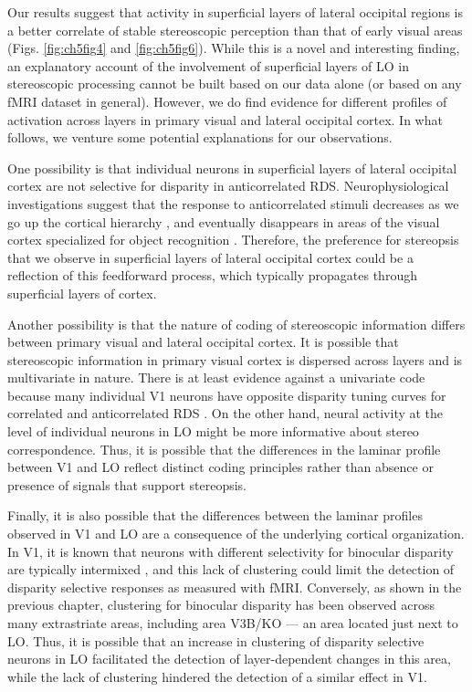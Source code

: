 Our results suggest that activity in superficial layers of lateral occipital regions is a better correlate of stable stereoscopic perception than that of early visual areas (Figs. \ref{fig:ch5fig4} and \ref{fig:ch5fig6}). While this is a novel and interesting finding, an explanatory account of the involvement of superficial layers of LO in stereoscopic processing cannot be built based on our data alone (or based on any fMRI dataset in general). However, we do find evidence for different profiles of activation across layers in primary visual and lateral occipital cortex. In what follows, we venture some potential explanations for our observations.

One possibility is that individual neurons in superficial layers of lateral occipital cortex are not selective for disparity in anticorrelated RDS. Neurophysiological investigations suggest that the response to anticorrelated stimuli decreases as we go up the cortical hierarchy \cite{Cumming:1997ve,Tanabe:2004mw}, and eventually disappears in areas of the visual cortex specialized for object recognition \cite{Janssen:2003fk}. Therefore, the preference for stereopsis that we observe in superficial layers of lateral occipital cortex could be a reflection of this feedforward process, which typically propagates through superficial layers of cortex.

Another possibility is that the nature of coding of stereoscopic information differs between primary visual and lateral occipital cortex. It is possible that stereoscopic information in primary visual cortex is dispersed across layers and is multivariate in nature. There is at least evidence against a univariate code because many individual V1 neurons have opposite disparity tuning curves for correlated and anticorrelated RDS \cite{Cumming:1997ve}. On the other hand, neural activity at the level of individual neurons in LO might be more informative about stereo correspondence. Thus, it is possible that the differences in the laminar profile between V1 and LO reflect distinct coding principles rather than absence or presence of signals that support stereopsis.

Finally, it is also possible that the differences between the laminar profiles observed in V1 and LO are a consequence of the underlying cortical organization. In V1, it is known that neurons with different selectivity for binocular disparity are typically intermixed \cite{Prince:2002cr}, and this lack of clustering could limit the detection of disparity selective responses as measured with fMRI. Conversely, as shown in the previous chapter, clustering for binocular disparity has been observed across many extrastriate areas, including area V3B/KO --- an area located just next to LO. Thus, it is possible that an increase in clustering of disparity selective neurons in LO facilitated the detection of layer-dependent changes in this area, while the lack of clustering hindered the detection of a similar effect in V1.




